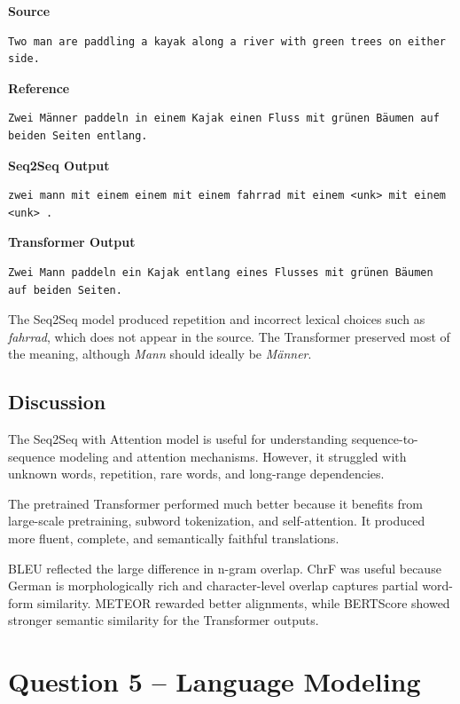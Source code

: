 \documentclass[11pt,a4paper]{article}
\begin{document}
\textbf{Source}
\begin{lstlisting}
Two man are paddling a kayak along a river with green trees on either side.
\end{lstlisting}

\textbf{Reference}
\begin{lstlisting}
Zwei Männer paddeln in einem Kajak einen Fluss mit grünen Bäumen auf beiden Seiten entlang.
\end{lstlisting}

\textbf{Seq2Seq Output}
\begin{lstlisting}
zwei mann mit einem einem mit einem fahrrad mit einem <unk> mit einem <unk> .
\end{lstlisting}

\textbf{Transformer Output}
\begin{lstlisting}
Zwei Mann paddeln ein Kajak entlang eines Flusses mit grünen Bäumen auf beiden Seiten.
\end{lstlisting}

The Seq2Seq model produced repetition and incorrect lexical choices such as \textit{fahrrad}, which does not appear in the source. The Transformer preserved most of the meaning, although \textit{Mann} should ideally be \textit{Männer}.

\subsection{Discussion}

The Seq2Seq with Attention model is useful for understanding sequence-to-sequence modeling and attention mechanisms. However, it struggled with unknown words, repetition, rare words, and long-range dependencies.

The pretrained Transformer performed much better because it benefits from large-scale pretraining, subword tokenization, and self-attention. It produced more fluent, complete, and semantically faithful translations.

BLEU reflected the large difference in n-gram overlap. ChrF was useful because German is morphologically rich and character-level overlap captures partial word-form similarity. METEOR rewarded better alignments, while BERTScore showed stronger semantic similarity for the Transformer outputs.

\section{Question 5 -- Language Modeling}
\end{document}
